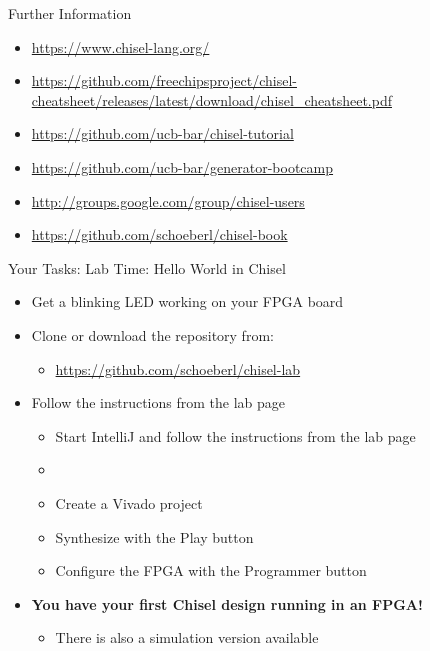 \begin{frame}[fragile]{Further Information}
\begin{itemize}
\item \url{https://www.chisel-lang.org/}
\item \url{https://github.com/freechipsproject/chisel-cheatsheet/releases/latest/download/chisel_cheatsheet.pdf}
\item \url{https://github.com/ucb-bar/chisel-tutorial}
\item \url{https://github.com/ucb-bar/generator-bootcamp}
\item \url{http://groups.google.com/group/chisel-users}
\item \url{https://github.com/schoeberl/chisel-book}
\end{itemize}
\end{frame}


\begin{frame}[fragile]{Your Tasks: Lab Time: Hello World in Chisel}
\begin{itemize}
\item Get a blinking LED working on your FPGA board
\item Clone or download the repository from:
\begin{itemize}
\item \url{https://github.com/schoeberl/chisel-lab}
\end{itemize}
\item Follow the instructions from the lab page
\begin{itemize}
\item Start IntelliJ and follow the instructions from the lab page
\item {}
\item Create a Vivado project
\item Synthesize with the Play button
\item Configure the FPGA with the Programmer button
\end{itemize}
\item {\bf You have your first Chisel design running in an FPGA!}
\begin{itemize}
\item There is also a simulation version available
\end{itemize}
\end{itemize}
\end{frame}



